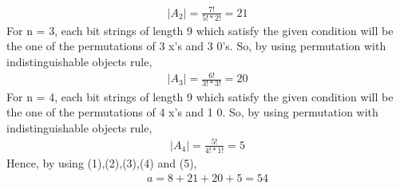 \documentclass[12pt]{article}
\begin{document}
\begin{enumerate}
\begin{equation}
\begin{split}
|A_{2}| = \frac{7!}{5!*2!} = 21
\end{split}
\end{equation}
For n = 3, each bit strings of length 9 which satisfy the given condition will be the one of the permutations of 3 x's and 3 0's. So, by using permutation with indistinguishable objects rule,
\begin{equation}
\begin{split}
|A_{3}| = \frac{6!}{3!*3!} = 20
\end{split}
\end{equation}
For n = 4, each bit strings of length 9 which satisfy the given condition will be the one of the permutations of 4 x's and 1 0. So, by using permutation with indistinguishable objects rule,
\begin{equation}
\begin{split}
|A_{4}| = \frac{5!}{4!*1!} = 5
\end{split}
\end{equation}
Hence, by using (1),(2),(3),(4) and (5),
\begin{equation*}
\begin{split}
a = 8 + 21 + 20 + 5 = 54
\end{split}
\end{equation*}


\end{enumerate}
\end{document}
